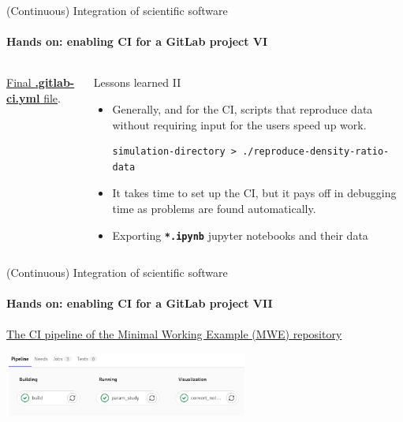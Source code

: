 \begin{frame}[fragile]{(Continuous) Integration of scientific software} 
    \framesubtitle{Hands on: enabling CI for a GitLab project VI} 
    \vfill

    \begin{columns}
        \begin{column}[c]{0.3\textwidth}
    \href{https://gitlab.com/tmaric/minimal-cse-ci-examples/-/blob/01-with-ci/.gitlab-ci.yml}{Final \textbf{.gitlab-ci.yml} file}. 
        \end{column}
        \begin{column}[c]{0.7\textwidth}
            Lessons learned II
            \begin{itemize}
                \item Generally, and for the CI, scripts that reproduce data without requiring input for the users speed up work.
                    \begin{verbatim}
simulation-directory > ./reproduce-density-ratio-data
                    \end{verbatim}
                \item It takes time to set up the CI, but it pays off in debugging time as problems are found automatically. 
                \item Exporting \textbf{\texttt{*.ipynb}} jupyter notebooks and their data  
            \end{itemize}
        \end{column}
    \end{columns}

\end{frame}

\begin{frame}[fragile]{(Continuous) Integration of scientific software} 
    \framesubtitle{Hands on: enabling CI for a GitLab project VII} 
    \vfill

    \href{https://gitlab.com/tmaric/minimal-cse-ci-examples/-/pipelines/374606049}{The CI pipeline of the Minimal Working Example (MWE) repository}

    \medskip
    \centering
    \includegraphics[width=0.6\textwidth]{figures/mwe-pipeline.png}

\end{frame}
